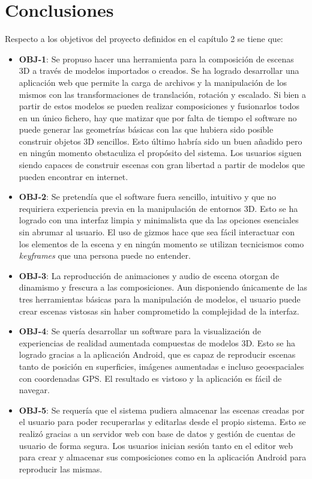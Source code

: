 \section{Conclusiones}

Respecto a los objetivos del proyecto definidos en el capítulo 2 se tiene que:

\begin{itemize}
    \item \textbf{OBJ-1}: Se propuso hacer una herramienta para la composición de escenas 3D a través de modelos importados o creados. Se ha logrado desarrollar una aplicación web que permite la carga de archivos y la manipulación de los mismos con las transformaciones de translación, rotación y escalado. Si bien a partir de estos modelos se pueden realizar composiciones y fusionarlos todos en un único fichero, hay que matizar que por falta de tiempo el software no puede generar las geometrías básicas con las que hubiera sido posible construir objetos 3D sencillos. Esto último habría sido un buen añadido pero en ningún momento obstaculiza el propósito del sistema. Los usuarios siguen siendo capaces de construir escenas con gran libertad a partir de modelos que pueden encontrar en internet.
    \item \textbf{OBJ-2}: Se pretendía que el software fuera sencillo, intuitivo y que no requiriera experiencia previa en la manipulación de entornos 3D. Esto se ha logrado con una interfaz limpia y minimalista que da las opciones esenciales sin abrumar al usuario. El uso de gizmos hace que sea fácil interactuar con los elementos de la escena y en ningún momento se utilizan tecnicismos como \textit{keyframes} que una persona puede no entender.
    \item \textbf{OBJ-3}: La reproducción de animaciones y audio de escena otorgan de dinamismo y frescura a las composiciones. Aun disponiendo únicamente de las tres herramientas básicas para la manipulación de modelos, el usuario puede crear escenas vistosas sin haber comprometido la complejidad de la interfaz.
    \item \textbf{OBJ-4}: Se quería desarrollar un software para la visualización de experiencias de realidad aumentada compuestas de modelos 3D. Esto se ha logrado gracias a la aplicación Android, que es capaz de reproducir escenas tanto de posición en superficies, imágenes aumentadas e incluso geoespaciales con coordenadas GPS. El resultado es vistoso y la aplicación es fácil de navegar.
    \item \textbf{OBJ-5}: Se requería que el sistema pudiera almacenar las escenas creadas por el usuario para poder recuperarlas y editarlas desde el propio sistema. Esto se realizó gracias a un servidor web con base de datos y gestión de cuentas de usuario de forma segura. Los usuarios inician sesión tanto en el editor web para crear y almacenar sus composiciones como en la aplicación Android para reproducir las mismas.
\end{itemize}

